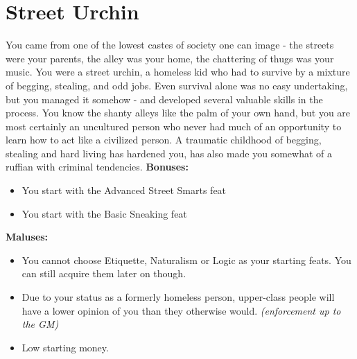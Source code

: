 \section{Street Urchin}
You came from one of the lowest castes of society one can image - the streets were your parents, the alley was your home, the chattering of thugs was your music. You were a street urchin, a homeless kid who had to survive by a mixture of begging, stealing, and odd jobs. Even survival alone was no easy undertaking, but you managed it somehow - and developed several valuable skills in the process. You know the shanty alleys like the palm of your own hand, but you are most certainly an uncultured person who never had much of an opportunity to learn how to act like a civilized person. A traumatic childhood of begging, stealing and hard living has hardened you, has also made you somewhat of a ruffian with criminal tendencies.\newline
\textbf{Bonuses:}
\begin{itemize}
	\item You start with the Advanced Street Smarts feat
	\item You start with the Basic Sneaking feat
\end{itemize}
\textbf{Maluses:}
\begin{itemize}
	\item You cannot choose Etiquette, Naturalism or Logic as your starting feats. You can still acquire them later on though.
	\item Due to your status as a formerly homeless person, upper-class people will have a lower opinion of you than they otherwise would. \textit{(enforcement up to the GM)}
	\item Low starting money.
\end{itemize}
